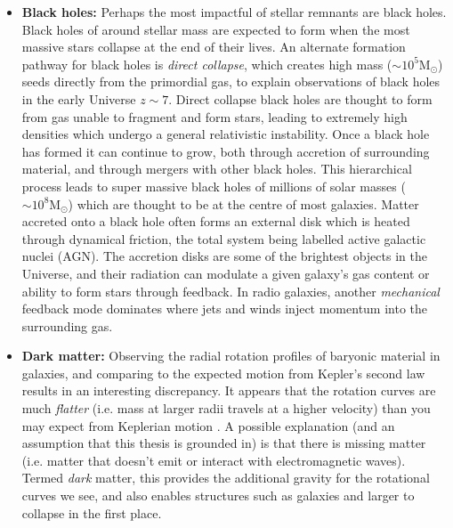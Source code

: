 \begin{itemize}
    \item \textbf{Black holes:} Perhaps the most impactful of stellar remnants are black holes. Black holes of around stellar mass are expected to form when the most massive stars collapse at the end of their lives. An alternate formation pathway for black holes is \textit{direct collapse}, which creates high mass ($\sim 10^5 \mathrm{M_{\odot}}$) seeds directly from the primordial gas, to explain observations of black holes in the early Universe $z \sim 7$. Direct collapse black holes are thought to form from gas unable to fragment and form stars, leading to extremely high densities which undergo a general relativistic instability. Once a black hole has formed it can continue to grow, both through accretion of surrounding material, and through mergers with other black holes. This hierarchical process leads to super massive black holes of millions of solar masses ($\sim \mathrm{10^8 M_{\odot}}$) which are thought to be at the centre of most galaxies. Matter accreted onto a black hole often forms an external disk which is heated through dynamical friction, the total system being labelled active galactic nuclei (AGN). The accretion disks are some of the brightest objects in the Universe, and their radiation can modulate a given galaxy's gas content or ability to form stars through feedback. In radio galaxies, another \textit{mechanical} feedback mode dominates where jets and winds inject momentum into the surrounding gas. 
    
    \item \textbf{Dark matter:} Observing the radial rotation profiles of baryonic material in galaxies, and comparing to the expected motion from Kepler's second law results in an interesting discrepancy. It appears that the rotation curves are much \textit{flatter} (i.e. mass at larger radii travels at a higher velocity) than you may expect from Keplerian motion \citep[][]{rubin1980}. A possible explanation (and an assumption that this thesis is grounded in) is that there is missing matter (i.e. matter that doesn't emit or interact with electromagnetic waves). Termed \textit{dark} matter, this provides the additional gravity for the rotational curves we see, and also enables structures such as galaxies and larger to collapse in the first place.
\end{itemize}


